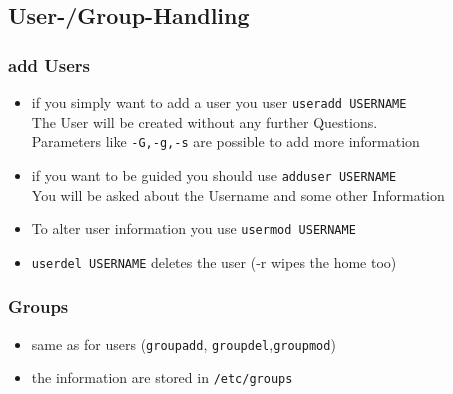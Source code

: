 \documentclass[draft,handout]{beamer}
\newcommand{\code}[1]{\colorbox{lGray}{\texttt{#1}}}
\begin{document}
    \subsection{User-/Group-Handling}
	    \begin{frame}
			\frametitle{add Users}
			\begin{itemize}
                \item<1-> if you simply want to add a user you user \code{useradd USERNAME} \\
                          The User will be created without any further Questions. \\
                          Parameters like \code{-G,-g,-s} are possible to add more information
                \item<2-> if you want to be guided you should use \code{adduser USERNAME} \\
                         You will be asked about the Username and some other Information
                \item<3-> To alter user information you use \code{usermod USERNAME}
                \item<4-> \code{userdel USERNAME} deletes the user (-r wipes the home too)
            \end{itemize}
		\end{frame}
	    \begin{frame}
			\frametitle{Groups}
			\begin{itemize}
                \item<1-> same as for users (\code{groupadd}, \code{groupdel},\code{groupmod})
                \item<2-> the information are stored in \code{/etc/groups}
            \end{itemize}
		\end{frame}
\end{document}
